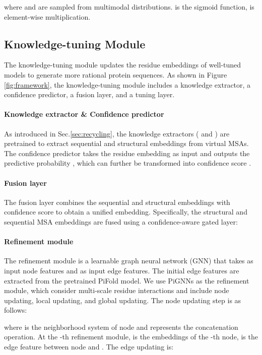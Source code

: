 \documentclass{article}
\begin{document}
where  and  are sampled from multimodal distributions.  is the sigmoid function,  is element-wise multiplication. 




\subsection{Knowledge-tuning Module}
The knowledge-tuning module updates the residue embeddings of well-tuned models to generate more rational protein sequences. As shown in Figure \ref{fig:framework}, the knowledge-tuning module includes a knowledge extractor, a confidence predictor, a fusion layer, and a tuning layer.

\paragraph{Knowledge extractor \& Confidence predictor} As introduced in Sec.\ref{sec:recycling}, the knowledge extractors ( and ) are pretrained to extract sequential and structural embeddings from virtual MSAs. The confidence predictor  takes the residue embedding  as input and outputs the predictive probability , which can further be transformed into confidence score .

\paragraph{Fusion layer} The fusion layer combines the sequential and structural embeddings with confidence score to obtain a unified embedding.  Specifically, the structural and sequential MSA embeddings are fused using a confidence-aware gated layer:


\paragraph{Refinement module} The refinement module is a learnable graph neural network (GNN) that takes  as input node features and  as input edge features. The initial edge features are extracted from the pretrained PiFold model. We use PiGNNs as the refinement module, which consider multi-scale residue interactions and include node updating, local updating, and global updating. The node updating step is as follows:




where  is the neighborhood system of node  and  represents the concatenation operation. At the -th refinement module,  is the embeddings of the -th node,  is the edge feature between node  and . The edge updating is:
\end{document}
